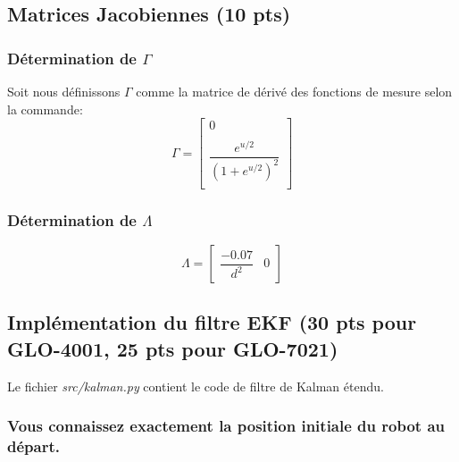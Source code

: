 \documentclass[12pt]{article}
\begin{document}
\subsection{Matrices Jacobiennes (10 pts)}

\subsubsection{Détermination de $\Gamma$}
Soit nous définissons $\Gamma$ comme la matrice de dérivé des fonctions de mesure selon la commande:
\begin{equation}
\Gamma =
\begin{bmatrix}
    0   \\
    \\
    \dfrac{e^{u/2}}{(1+e^{u/2})^2} \\
\end{bmatrix}
\end{equation}

\subsubsection{Détermination de $\Lambda$}
\begin{equation}
\Lambda =
\begin{bmatrix}
    \dfrac{-0.07}{d^2} & 0
\end{bmatrix}
\end{equation}

\subsection{Implémentation du filtre EKF (30 pts pour GLO-4001, 25 pts pour GLO-7021)}

Le fichier \textit{src/kalman.py} contient le code de filtre de Kalman étendu.

\subsubsection{Vous connaissez exactement la position initiale du robot au départ.}
\end{document}
